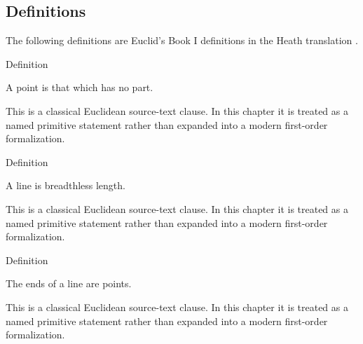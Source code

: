 \subsection*{Definitions}

\begin{remark*}
The following definitions are Euclid's Book I definitions in the Heath
translation \citep[Book I, Definitions 1--23]{euclid-elements-heath}.
\end{remark*}


\begin{definitionbox}{Definition}
\begin{definition}[Point]
\label{def:euclid-point}
A point is that which has no part.
\end{definition}
\end{definitionbox}
\begin{remark*}
This is a classical Euclidean source-text clause. In this chapter it is treated
as a named primitive statement rather than expanded into a modern first-order
formalization.
\end{remark*}

\begin{lra-not-visible}
\NoLocalDependencies
\end{lra-not-visible}

\begin{definitionbox}{Definition}
\begin{definition}[Line]
\label{def:euclid-line}
A line is breadthless length.
\end{definition}
\end{definitionbox}
\begin{remark*}
This is a classical Euclidean source-text clause. In this chapter it is treated
as a named primitive statement rather than expanded into a modern first-order
formalization.
\end{remark*}

\begin{lra-not-visible}
\NoLocalDependencies
\end{lra-not-visible}

\begin{definitionbox}{Definition}
\begin{definition}
\label{def:euclid-ends-of-a-line}
The ends of a line are points.
\end{definition}
\end{definitionbox}
\begin{remark*}
This is a classical Euclidean source-text clause. In this chapter it is treated
as a named primitive statement rather than expanded into a modern first-order
formalization.
\end{remark*}

